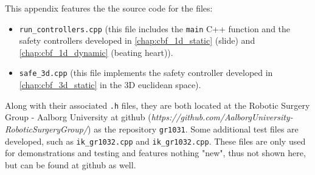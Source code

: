This appendix features the the source code for the files:
\begin{itemize}
\item \texttt{run\_controllers.cpp} (this file includes the \texttt{main} C++ function and the safety controllers developed in \autoref{chap:cbf_1d_static} (slide) and \autoref{chap:cbf_1d_dynamic} (beating heart)).
\item \texttt{safe\_3d.cpp}  (this file implements the safety controller developed in \autoref{chap:cbf_3d_static} in the 3D euclidean space).
\end{itemize}
Along with their associated \texttt{.h} files, they are both located at the Robotic Surgery Group - Aalborg University at github (\textit{https://github.com/AalborgUniversity-RoboticSurgeryGroup/}) as the repository \texttt{gr1031}. Some additional test files are developed, such as \texttt{ik\_gr1032.cpp} and \texttt{ik\_gr1032.cpp}. These files are only used for demonstrations and testing and features nothing "new", thus not shown here, but can be found at github as well.

